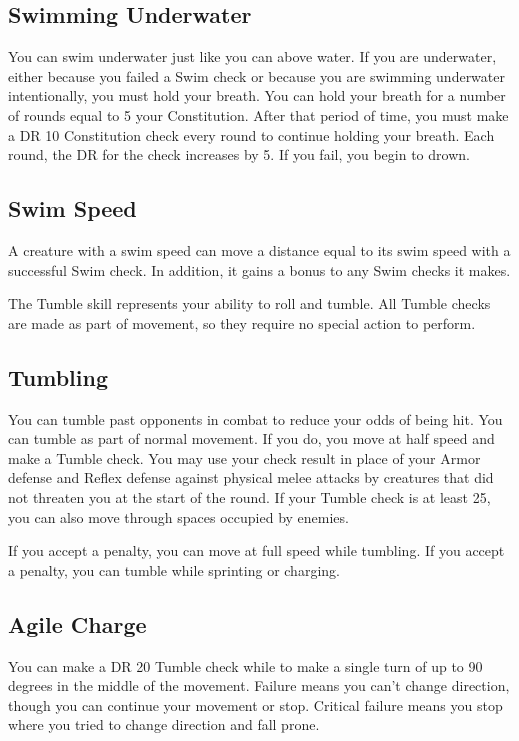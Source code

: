    \subsection{Swimming Underwater}
        You can swim underwater just like you can above water. If you are underwater, either because you failed a Swim check or because you are swimming underwater intentionally, you must hold your breath. You can hold your breath for a number of rounds equal to 5 \add your Constitution. After that period of time, you must make a DR 10 Constitution check every round to continue holding your breath. Each round, the DR for the check increases by 5. If you fail, you begin to drown.

    \subsection{Swim Speed}\label{Swim Speed}
        A creature with a swim speed can move a distance equal to its swim speed with a successful Swim check.
        In addition, it gains a  bonus to any Swim checks it makes.

        The Tumble skill represents your ability to roll and tumble. All Tumble checks are made as part of movement, so they require no special action to perform.

    \subsection{Tumbling}

        You can tumble past opponents in combat to reduce your odds of being hit. You can tumble as part of normal movement. If you do, you move at half speed and make a Tumble check. You may use your check result in place of your Armor defense and Reflex defense against physical melee attacks by creatures that did not threaten you at the start of the round. If your Tumble check is at least 25, you can also move through spaces occupied by enemies.

        If you accept a  penalty, you can move at full speed while tumbling. If you accept a  penalty, you can tumble while sprinting or charging.

    \subsection{Agile Charge}
        You can make a DR 20 Tumble check while  to make a single turn of up to 90 degrees in the middle of the movement. Failure means you can't change direction, though you can continue your movement or stop. Critical failure means you stop where you tried to change direction and fall prone.

